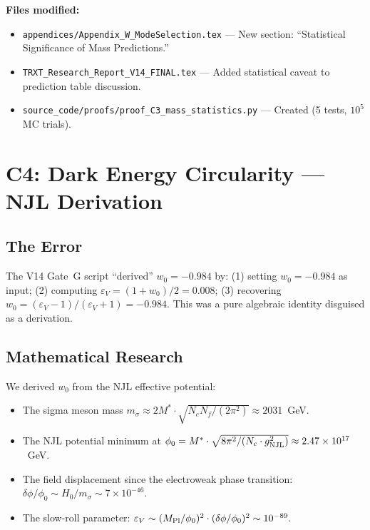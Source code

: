 \documentclass[11pt,a4paper]{article}
\begin{document}
\textbf{Files modified:}
\begin{itemize}
    \item \texttt{appendices/Appendix\_W\_ModeSelection.tex} --- New section: ``Statistical Significance of Mass Predictions.''
    \item \texttt{TRXT\_Research\_Report\_V14\_FINAL.tex} --- Added statistical caveat to prediction table discussion.
    \item \texttt{source\_code/proofs/proof\_C3\_mass\_statistics.py} --- Created (5 tests, $10^5$ MC trials).
\end{itemize}

\section{C4: Dark Energy Circularity --- NJL Derivation}
\label{sec:C4}

\subsection{The Error}
The V14 Gate~G script ``derived'' $w_0 = -0.984$ by: (1) setting $w_0 = -0.984$ as input; (2) computing $\varepsilon_V = (1+w_0)/2 = 0.008$; (3) recovering $w_0 = (\varepsilon_V - 1)/(\varepsilon_V + 1) = -0.984$.  This was a pure algebraic identity disguised as a derivation.

\subsection{Mathematical Research}

We derived $w_0$ from the NJL effective potential:
\begin{itemize}
    \item The sigma meson mass $m_\sigma \approx 2M^* \cdot \sqrt{N_c N_f/(2\pi^2)} \approx 2031$~GeV.
    \item The NJL potential minimum at $\phi_0 = M^* \cdot \sqrt{8\pi^2/(N_c \cdot g_{\rm NJL}^2)} \approx 2.47 \times 10^{17}$~GeV.
    \item The field displacement since the electroweak phase transition: $\delta\phi/\phi_0 \sim H_0/m_\sigma \sim 7 \times 10^{-46}$.
    \item The slow-roll parameter: $\varepsilon_V \sim (M_{\rm Pl}/\phi_0)^2 \cdot (\delta\phi/\phi_0)^2 \sim 10^{-89}$.
\end{itemize}
\end{document}
